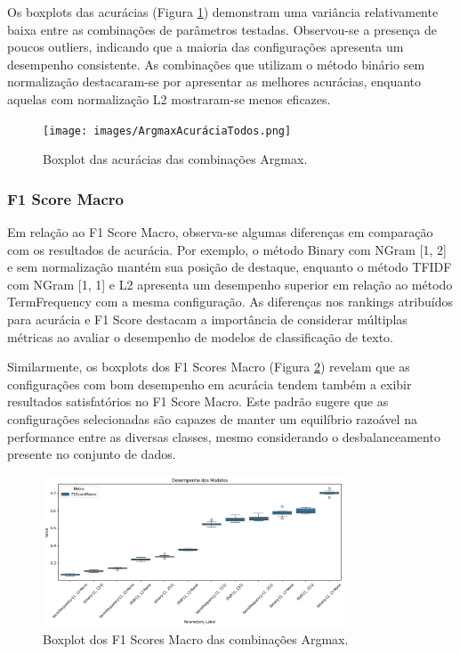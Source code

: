 Os boxplots das acurácias (Figura \ref{fig:boxplot_acuracia}) demonstram uma variância relativamente baixa entre as combinações de parâmetros testadas. Observou-se a presença de poucos outliers, indicando que a maioria das configurações apresenta um desempenho consistente. As combinações que utilizam o método binário sem normalização destacaram-se por apresentar as melhores acurácias, enquanto aquelas com normalização L2 mostraram-se menos eficazes.
\begin{figure}[H]
    \centering
    \texttt{[image: images/ArgmaxAcuráciaTodos.png]}
    \caption{Boxplot das acurácias das combinações Argmax.}
    \label{fig:boxplot_acuracia}
\end{figure}

\subsubsection{F1 Score Macro}


Em relação ao F1 Score Macro, observa-se algumas diferenças em comparação com os resultados de acurácia. Por exemplo, o método Binary com NGram [1, 2] e sem normalização mantém sua posição de destaque, enquanto o método TFIDF com NGram [1, 1] e L2 apresenta um desempenho superior em relação ao método TermFrequency com a mesma configuração. As diferenças nos rankings atribuídos para acurácia e F1 Score destacam a importância de considerar múltiplas métricas ao avaliar o desempenho de modelos de classificação de texto.

Similarmente, os boxplots dos F1 Scores Macro (Figura \ref{fig:boxplot_f1score}) revelam que as configurações com bom desempenho em acurácia tendem também a exibir resultados satisfatórios no F1 Score Macro. Este padrão sugere que as configurações selecionadas são capazes de manter um equilíbrio razoável na performance entre as diversas classes, mesmo considerando o desbalanceamento presente no conjunto de dados.

\begin{figure}[H]
    \centering
    \includegraphics[width=0.8\textwidth]{images/ArgmaxF1ScoreTodos.png}
    \caption{Boxplot dos F1 Scores Macro das combinações Argmax.}
    \label{fig:boxplot_f1score}
\end{figure}

